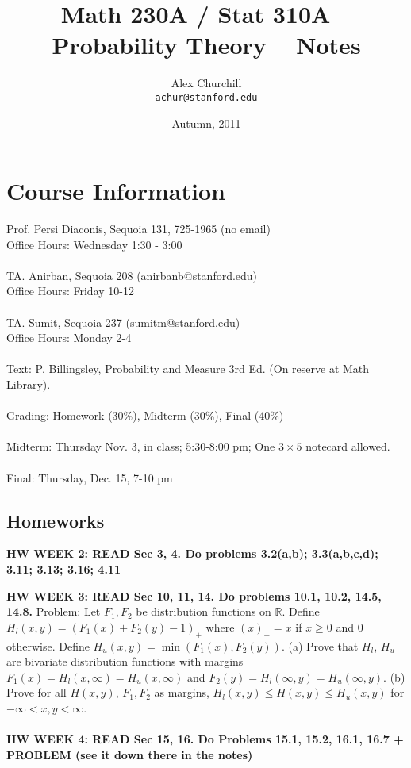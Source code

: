 \documentclass[12pt]{article}
\title{Math 230A / Stat 310A -- Probability Theory -- Notes}
\author{
Alex Churchill\\
\small \texttt{achur@stanford.edu}
}
\date{Autumn, 2011}
\begin{document}
\maketitle
\thispagestyle{empty} %
\tableofcontents


\newpage

\setcounter{page}{1} %

\section{Course Information}
Prof. Persi Diaconis, Sequoia 131, 725-1965 (no email) \\
Office Hours: Wednesday 1:30 - 3:00
\\ \\
TA. Anirban, Sequoia 208 (anirbanb@stanford.edu) \\
Office Hours: Friday 10-12
\\ \\
TA. Sumit, Sequoia 237 (sumitm@stanford.edu) \\
Office Hours: Monday 2-4
\\ \\
Text: P. Billingsley, \underline{Probability and Measure} 3rd Ed. (On reserve at Math Library).
\\ \\
Grading: Homework (30\%), Midterm (30\%), Final (40\%)
\\ \\
Midterm: Thursday Nov. 3, in class; 5:30-8:00 pm; One $3 \times 5$ notecard allowed.
\\ \\
Final: Thursday, Dec. 15, 7-10 pm

\subsection{Homeworks}

{\bf HW WEEK 2: READ Sec 3, 4.  Do problems 3.2(a,b); 3.3(a,b,c,d); 3.11; 3.13; 3.16; 4.11}

{\bf HW WEEK 3: READ Sec 10, 11, 14.  Do problems 10.1, 10.2, 14.5, 14.8.}
Problem: Let $F_1, F_2$ be distribution functions on $\mathbb{R}$.  Define $H_l(x,y) = (F_1(x) + F_2(y) - 1)_+$ where $(x)_+ = x$ if $x \ge 0$ and $0$ otherwise.  Define $H_u(x,y) = \min(F_1(x), F_2(y))$.  (a) Prove that $H_l$, $H_u$ are bivariate distribution functions with margins $F_1(x) = H_l(x, \infty) = H_u(x, \infty)$ and $F_2(y) = H_l(\infty, y) = H_u(\infty, y)$. (b) Prove for all $H(x,y)$, $F_1, F_2$ as margins, $H_l(x,y) \le H(x,y) \le H_u(x,y)$ for $-\infty < x,y < \infty$.
\\ \\
{\bf HW WEEK 4: READ Sec 15, 16.  Do Problems 15.1, 15.2, 16.1, 16.7 + PROBLEM (see it down there in the notes)}
\end{document}
